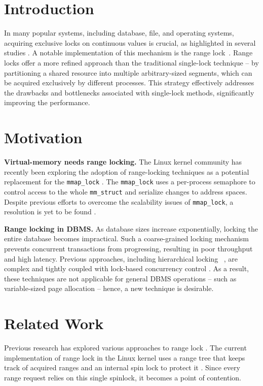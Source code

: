 \section{Introduction}
In many popular systems, including database, file, and operating systems, acquiring exclusive locks on continuous values is crucial, as highlighted in several studies \cite{readerWriterLocks2017, graefe2007hierarchical, lee2021concurrent, gao2023citron, lee2019write}. A notable implementation of this mechanism is the range lock~\parencite{gao2023citron, kogan2020scalable}.
Range locks offer a more refined approach than the traditional single-lock technique -- by partitioning a shared resource into multiple arbitrary-sized segments, which can be acquired exclusively by different processes.
This strategy effectively addresses the drawbacks and bottlenecks associated with single-lock methods, significantly improving the performance.

\section{Motivation}

\textbf{Virtual-memory needs range locking.}
The Linux kernel community has recently been exploring the adoption of range-locking techniques as a potential replacement for the \texttt{mmap\_lock} \parencite{readerWriterLocks2017, mapleTree2021, mmapLock2022}. The \texttt{mmap\_lock} uses a per-process semaphore to control access to the whole \texttt{mm\_struct} \parencite{mmstruct2023} and serialize changes to address spaces. Despite previous efforts to overcome the scalability issues of \texttt{mmap\_lock}, a resolution is yet to be found \parencite{mmapLock2022}.

\textbf{Range locking in DBMS.}
As database sizes increase exponentially, locking the entire database becomes impractical.
Such a coarse-grained locking mechanism prevents concurrent transactions from progressing, resulting in poor throughput and high latency. 
Previous approaches, including hierarchical locking ~\parencite{graefe2007hierarchical}, are complex and tightly coupled with lock-based concurrency control \parencite{andy2022database}.
As a result, these techniques are not applicable for general DBMS operations -- such as variable-sized page allocation -- hence, a new technique is desirable.

\section{Related Work}
Previous research has explored various approaches to range lock \parencite{linuxRangeLockImpl2013, song2013parallelizing, kogan2020scalable}. The current implementation of range lock in the Linux kernel uses a range tree that keeps track of acquired ranges and an internal spin lock to protect it \parencite{linuxRangeLockImpl2013}. Since every range request relies on this single spinlock, it becomes a point of contention. 

